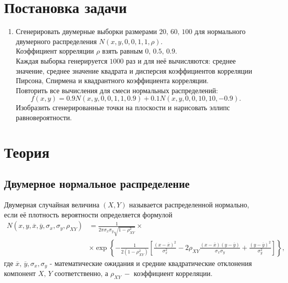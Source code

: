 \documentclass[a4paper]{article}
\begin{document}

\tableofcontents
{}
\newpage
\listoffigures
{}
\newpage
\listoftables
{}
\newpage
\section{Постановка задачи}
\begin{enumerate}
    \item Сгенерировать двумерные выборки размерами $20,\,60,\,100$ для нормального двумерного распределения $N(x,y,0,0,1,1,\rho)$.\\
    Коэффициент корреляции $\rho$ взять равным $0,\,0.5,\,0.9$.\\
    Каждая выборка генерируется $1000$ раз и для неё вычисляются: среднее значение, среднее значение квадрата и дисперсия коэффициентов корреляции Пирсона, Спирмена и квадрантного коэффициента корреляции.\\
    Повторить все вычисления для смеси нормальных распределений:
    \begin{equation*}
        f(x,y)=0.9N(x,y,0,0,1,1,0.9)+0.1N(x,y,0,0,10,10,-0.9).
    \end{equation*}
    Изобразить сгенерированные точки на плоскости и нарисовать эллипс
    равновероятности.
\end{enumerate}
\section{Теория}
\subsection{Двумерное нормальное распределение}
Двумерная случайная величина $(X, Y)$ называется распределенной нормально, если её плотность вероятности определяется формулой
\begin{align}
    N(x,y,\overline{x},\overline{y},\sigma_x,\sigma_y,\rho_{XY}^{})&=\frac{1}{2\pi\sigma_x\sigma_y\sqrt{1-\rho_{XY}^2}}\times\nonumber\\
    &\times\exp\left\{-\frac{1}{2(1-\rho_{XY}^2)}\left[\frac{\left(x-\overline{x}\right)^2}{\sigma_x^2}-2\rho_{XY}^{}\frac{(x-\overline{x})(y-\overline{y})}{\sigma_x\sigma_y}+\frac{\left(y-\overline{y}\right)^2}{\sigma_y^2}\right]\right\},
\end{align}
где $\overline{x},\,\overline{y},\sigma_x,\sigma_y$ - математические ожидания и средние квадратические отклонения компонент $X,\,Y$ соответственно, а $\rho_{XY}^{}\:-$ коэффициент корреляции. 
\end{document}

